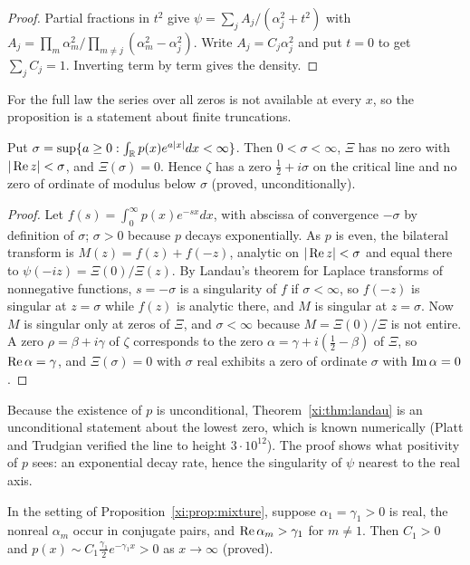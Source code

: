 \begin{proof}
Partial fractions in $t^2$ give $\psi=\sum_jA_j/(\alpha_j^2+t^2)$ with $A_j=\prod_m\alpha_m^2\big/\prod_{m\ne j}(\alpha_m^2-\alpha_j^2)$. Write $A_j=C_j\alpha_j^2$ and put $t=0$ to get $\sum_jC_j=1$. Inverting term by term gives the density.
\end{proof}

For the full law the series over all zeros is not available at every $x$, so the proposition is a statement about finite truncations.

\begin{theorem}\label{xi:thm:landau}
Put $\sigma=\sup\{a\ge0:\int_{\mathbb{R}} p(x)e^{a|x|}dx<\infty\}$. Then $0<\sigma<\infty$, $\Xi$ has no zero with $|\operatorname{Re} z|<\sigma$, and $\Xi(\sigma)=0$. Hence $\zeta$ has a zero $\frac12+i\sigma$ on the critical line and no zero of ordinate of modulus below $\sigma$ (proved, unconditionally).
\end{theorem}

\begin{proof}
Let $f(s)=\int_0^\infty p(x)e^{-sx}dx$, with abscissa of convergence $-\sigma$ by definition of $\sigma$; $\sigma>0$ because $p$ decays exponentially. As $p$ is even, the bilateral transform is $M(z)=f(z)+f(-z)$, analytic on $|\operatorname{Re} z|<\sigma$ and equal there to $\psi(-iz)=\Xi(0)/\Xi(z)$. By Landau's theorem for Laplace transforms of nonnegative functions, $s=-\sigma$ is a singularity of $f$ if $\sigma<\infty$, so $f(-z)$ is singular at $z=\sigma$ while $f(z)$ is analytic there, and $M$ is singular at $z=\sigma$. Now $M$ is singular only at zeros of $\Xi$, and $\sigma<\infty$ because $M=\Xi(0)/\Xi$ is not entire. A zero $\rho=\beta+i\gamma$ of $\zeta$ corresponds to the zero $\alpha=\gamma+i(\frac12-\beta)$ of $\Xi$, so $\operatorname{Re}\alpha=\gamma$, and $\Xi(\sigma)=0$ with $\sigma$ real exhibits a zero of ordinate $\sigma$ with $\operatorname{Im}\alpha=0$.
\end{proof}

Because the existence of $p$ is unconditional, Theorem~\ref{xi:thm:landau} is an unconditional statement about the lowest zero, which is known numerically (Platt and Trudgian \cite{PT21} verified the line to height $3\cdot10^{12}$). The proof shows what positivity of $p$ sees: an exponential decay rate, hence the singularity of $\psi$ nearest to the real axis.

\begin{lemma}\label{xi:lem:tail}
In the setting of Proposition~\ref{xi:prop:mixture}, suppose $\alpha_1=\gamma_1>0$ is real, the nonreal $\alpha_m$ occur in conjugate pairs, and $\operatorname{Re}\alpha_m>\gamma_1$ for $m\ne1$. Then $C_1>0$ and $p(x)\sim C_1\frac{\gamma_1}2e^{-\gamma_1x}>0$ as $x\to\infty$ (proved).
\end{lemma}

